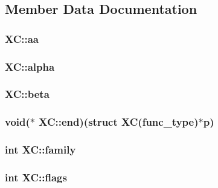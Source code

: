 \subsection{Member Data Documentation}
\hypertarget{struct_x_c_aef42535c814fc8c060a05251915e9dc4}{
\subsubsection[{aa}]{ X\-C\-::aa}}\label{struct_x_c_aef42535c814fc8c060a05251915e9dc4}
\hypertarget{struct_x_c_ae9121ab9aa44bfdf5fd7a9fb98da3962}{
\subsubsection[{alpha}]{ X\-C\-::alpha}}\label{struct_x_c_ae9121ab9aa44bfdf5fd7a9fb98da3962}
\hypertarget{struct_x_c_ad7d7708cffe684a266e3099a2f496b9a}{
\subsubsection[{beta}]{ X\-C\-::beta}}\label{struct_x_c_ad7d7708cffe684a266e3099a2f496b9a}
\hypertarget{struct_x_c_a3de037ae95b5dc34038931e65bc30156}{
\subsubsection[{end}]{\setlength{\rightskip}{0pt plus 5cm}void($\ast$ X\-C\-::end)(struct {\bf X\-C}(func\-\_\-type)$\ast$p)}}\label{struct_x_c_a3de037ae95b5dc34038931e65bc30156}
\hypertarget{struct_x_c_a19222c78e83fe26357674d70803bb99e}{
\subsubsection[{family}]{\setlength{\rightskip}{0pt plus 5cm}int X\-C\-::family}}\label{struct_x_c_a19222c78e83fe26357674d70803bb99e}
\hypertarget{struct_x_c_a5e91c2bd0970d21b5b279a616b81d696}{
\subsubsection[{flags}]{\setlength{\rightskip}{0pt plus 5cm}int X\-C\-::flags}}\label{struct_x_c_a5e91c2bd0970d21b5b279a616b81d696}
